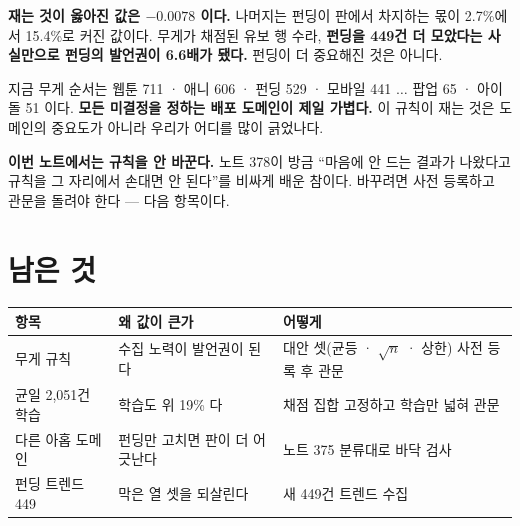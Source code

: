 \documentclass[11pt]{article}
\begin{document}
\textbf{재는 것이 옳아진 값은 $-0.0078$ 이다.} 나머지는 펀딩이 판에서
차지하는 몫이 2.7\%에서 15.4\%로 커진 값이다. 무게가 채점된 유보 행 수라,
\textbf{펀딩을 449건 더 모았다는 사실만으로 펀딩의 발언권이 6.6배가
됐다.} 펀딩이 더 중요해진 것은 아니다.

지금 무게 순서는 웹툰 711 · 애니 606 · 펀딩 529 · 모바일 441 $\ldots$
팝업 65 · 아이돌 51 이다. \textbf{모든 미결정을 정하는 배포 도메인이
제일 가볍다.} 이 규칙이 재는 것은 도메인의 중요도가 아니라 우리가 어디를
많이 긁었나다.

\textbf{이번 노트에서는 규칙을 안 바꾼다.} 노트 378이 방금 ``마음에 안
드는 결과가 나왔다고 규칙을 그 자리에서 손대면 안 된다''를 비싸게 배운
참이다. 바꾸려면 사전 등록하고 관문을 돌려야 한다 --- 다음 항목이다.

\section{남은 것}

\begin{center}
\begin{tabular}{lll}
\hline
항목 & 왜 값이 큰가 & 어떻게 \\
\hline
무게 규칙 & 수집 노력이 발언권이 된다 & 대안 셋(균등 · $\sqrt{n}$ · 상한) 사전 등록 후 관문 \\
균일 2,051건 학습 & 학습도 위 19\% 다 & 채점 집합 고정하고 학습만 넓혀 관문 \\
다른 아홉 도메인 & 펀딩만 고치면 판이 더 어긋난다 & 노트 375 분류대로 바닥 검사 \\
펀딩 트렌드 449 & 막은 열 셋을 되살린다 & 새 449건 트렌드 수집 \\
\hline
\end{tabular}
\end{center}
\end{document}
